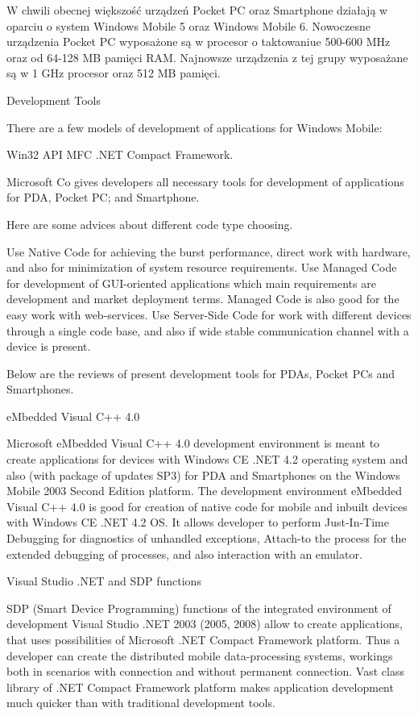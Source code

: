 W chwili obecnej większość urządzeń Pocket PC oraz Smartphone działają w oparciu
o system Windows Mobile 5 oraz Windows Mobile 6. Nowoczesne urządzenia Pocket PC
wyposażone są w procesor o taktowaniue 500-600 MHz oraz od 64-128 MB pamięci RAM.
Najnowsze urządzenia z tej grupy wyposażane są w 1 GHz procesor oraz 512 MB
pamięci.

Development Tools

There are a few models of development of applications for Windows Mobile:

Win32 API MFC .NET Compact Framework.

Microsoft Co gives developers all necessary tools for development of applications
for PDA, Pocket PC; and Smartphone.

Here are some advices about different code type choosing.

Use Native Code for achieving the burst performance, direct work with hardware,
and also for minimization of system resource requirements. Use Managed Code for
development of GUI-oriented applications which main requirements are development
and market deployment terms. Managed Code is also good for the easy work with
web-services. Use Server-Side Code for work with different devices through a
single code base, and also if wide stable communication channel with a device is
present.

Below are the reviews of present development tools for PDAs, Pocket PCs and
Smartphones.

eMbedded Visual C++ 4.0

Microsoft eMbedded Visual C++ 4.0 development environment is meant to create
applications for devices with Windows CE .NET 4.2 operating system and also (with
package of updates SP3) for PDA and Smartphones on the Windows Mobile 2003 Second
Edition platform. The development environment eMbedded Visual C++ 4.0 is good for
creation of native code for mobile and inbuilt devices with Windows CE .NET 4.2
OS. It allows developer to perform Just-In-Time Debugging for diagnostics of
unhandled exceptions, Attach-to the process for the extended debugging of
processes, and also interaction with an emulator.

Visual Studio .NET and SDP functions

SDP (Smart Device Programming) functions of the integrated environment of
development Visual Studio .NET 2003 (2005, 2008) allow to create applications,
that uses possibilities of Microsoft .NET Compact Framework platform. Thus a
developer can create the distributed mobile data-processing systems, workings
both in scenarios with connection and without permanent connection. Vast class
library of .NET Compact Framework platform makes application development much
quicker than with traditional development tools.

